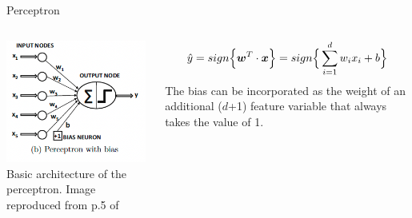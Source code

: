 \begin{frame}[t]{Perceptron}

    \begin{columns}
        \begin{column}{0.50\textwidth}
         \begin{center}
            \includegraphics[width=0.98\textwidth]{./images/perceptron/perceptron_with_bias.png}\\
            \vspace{0.5cm}
            {\scriptsize \color{col:attribution} 
            Basic architecture of the perceptron. 
            Image reproduced from p.5 of \cite{Aggarwal:2018SpringerDL}}\\
         \end{center}
        \end{column}
        \begin{column}{0.50\textwidth}
            \begin{equation}
                \hat{y} = 
                    sign\Big\{ \boldsymbol{w}^T \cdot \boldsymbol{x} \Big\} = 
                    sign\Big\{ \sum_{i=1}^{d} w_i x_i + b \Big\}
             \end{equation}
            The bias can be incorporated as the weight of an additional ($d$+1) feature 
            variable that always takes the value of 1.        
        \end{column}
      \end{columns}

\end{frame}

